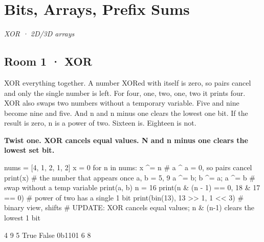 \documentclass[11pt,a4paper]{report}
\begin{document}
\chapter{Bits, Arrays, Prefix Sums}
\textit{XOR · 2D/3D arrays}
\section*{Room 1 · XOR}
XOR everything together. A number XORed with itself is zero, so pairs cancel and only the single number is left. For four, one, two, one, two it prints four. XOR also swaps two numbers without a temporary variable. Five and nine become nine and five. And n and n minus one clears the lowest one bit. If the result is zero, n is a power of two. Sixteen is. Eighteen is not.
\begin{tcolorbox}[colback=yellow!12,colframe=orange!70!black,boxrule=0.4pt,left=4pt,right=4pt,top=2pt,bottom=2pt]\textbf{Twist one. XOR cancels equal values. N and n minus one clears the lowest set bit.}\end{tcolorbox}
\begin{Code}
nums = [4, 1, 2, 1, 2]
x = 0
for n in nums: x ^= n                       # a ^ a = 0, so pairs cancel
print(x)                                    # the number that appears once
a, b = 5, 9
a ^= b; b ^= a; a ^= b                      # swap without a temp variable
print(a, b)
n = 16
print(n & (n - 1) == 0, 18 & 17 == 0)       # power of two has a single 1 bit
print(bin(13), 13 >> 1, 1 << 3)             # binary view, shifts
# UPDATE: XOR cancels equal values; n & (n-1) clears the lowest 1 bit
\end{Code}
\begin{Out}
4
9 5
True False
0b1101 6 8
\end{Out}
\end{document}
